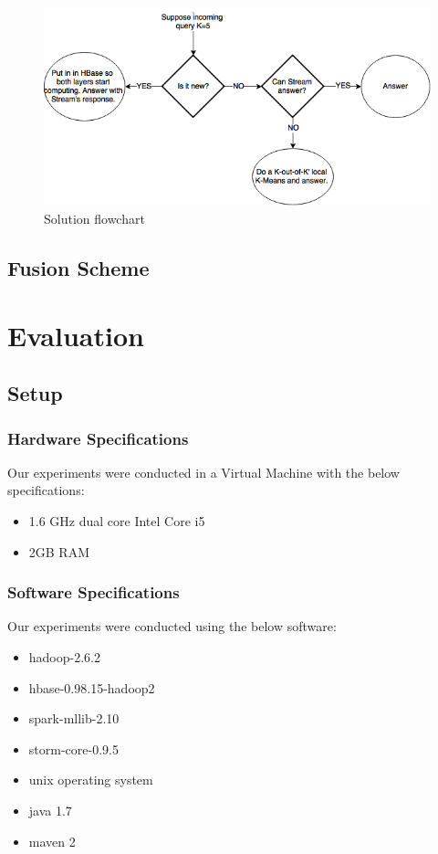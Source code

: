 \documentclass{lmproj}
\begin{document}
\begin{figure}[H]
	\centering	
	\includegraphics[scale=0.5]{usecase}
	\caption{Solution flowchart}
\end{figure}


\section{Fusion Scheme}
\label{kmeans}




\chapter{Evaluation}
\label{evaluation}

\section{Setup}
\label{evaluation}

\subsection{Hardware Specifications}
Our experiments were conducted in a Virtual Machine with the below specifications:
\begin{itemize}
	\item 1.6 GHz dual core Intel Core i5
	\item 2GB RAM
\end{itemize}

\subsection{Software Specifications}
Our experiments were conducted using the below software:
\begin{itemize}
	\item hadoop-2.6.2
	\item hbase-0.98.15-hadoop2
	\item spark-mllib-2.10
	\item storm-core-0.9.5
	\item unix operating system
	\item java 1.7
	\item maven 2
\end{itemize}
\end{document}
